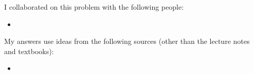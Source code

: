 I collaborated on this problem with the following people:
\begin{blue}
  \begin{itemize}
  \item \REPLACEME                    %
  \end{itemize}
\end{blue}

My answers use ideas from the following sources (other than the lecture notes and textbooks): 
\begin{blue}
  \begin{itemize}
  \item \REPLACEME                    %
  \end{itemize}
\end{blue}


